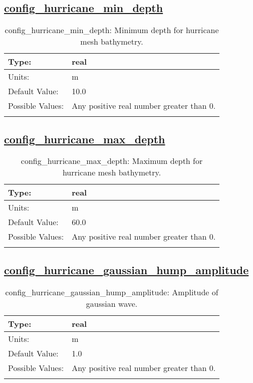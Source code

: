 \subsection[config\_hurricane\_min\_depth]{\hyperref[sec:nm_tab_hurricane]{config\_hurricane\_min\_depth}}
\label{subsec:nm_sec_config_hurricane_min_depth}
\begin{center}
\begin{longtable}{| p{2.0in} || p{4.0in} |}
    \hline
    Type: & real \\
    \hline
    Units: & \si{m} \\
    \hline
    Default Value: & 10.0 \\
    \hline
    Possible Values: & Any positive real number greater than 0. \\
    \hline
    \caption{config\_hurricane\_min\_depth: Minimum depth for hurricane mesh bathymetry.}
\end{longtable}
\end{center}
\subsection[config\_hurricane\_max\_depth]{\hyperref[sec:nm_tab_hurricane]{config\_hurricane\_max\_depth}}
\label{subsec:nm_sec_config_hurricane_max_depth}
\begin{center}
\begin{longtable}{| p{2.0in} || p{4.0in} |}
    \hline
    Type: & real \\
    \hline
    Units: & \si{m} \\
    \hline
    Default Value: & 60.0 \\
    \hline
    Possible Values: & Any positive real number greater than 0. \\
    \hline
    \caption{config\_hurricane\_max\_depth: Maximum depth for hurricane mesh bathymetry.}
\end{longtable}
\end{center}
\subsection[config\_hurricane\_gaussian\_hump\_amplitude]{\hyperref[sec:nm_tab_hurricane]{config\_hurricane\_gaussian\_hump\_amplitude}}
\label{subsec:nm_sec_config_hurricane_gaussian_hump_amplitude}
\begin{center}
\begin{longtable}{| p{2.0in} || p{4.0in} |}
    \hline
    Type: & real \\
    \hline
    Units: & \si{m} \\
    \hline
    Default Value: & 1.0 \\
    \hline
    Possible Values: & Any positive real number greater than 0. \\
    \hline
    \caption{config\_hurricane\_gaussian\_hump\_amplitude: Amplitude of gaussian wave.}
\end{longtable}
\end{center}
